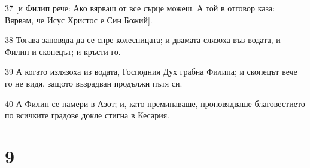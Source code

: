 \par 37 [и Филип рече: Ако вярваш от все сърце можеш. А той в отговор каза: Вярвам, че Исус Христос е Син Божий].
\par 38 Тогава заповяда да се спре колесницата; и двамата слязоха във водата, и Филип и скопецът; и кръсти го.
\par 39 А когато излязоха из водата, Господния Дух грабна Филипа; и скопецът вече го не видя, защото възрадван продължи пътя си.
\par 40 А Филип се намери в Азот; и, като преминаваше, проповядваше благовестието по всичките градове докле стигна в Кесария.

\chapter{9}

